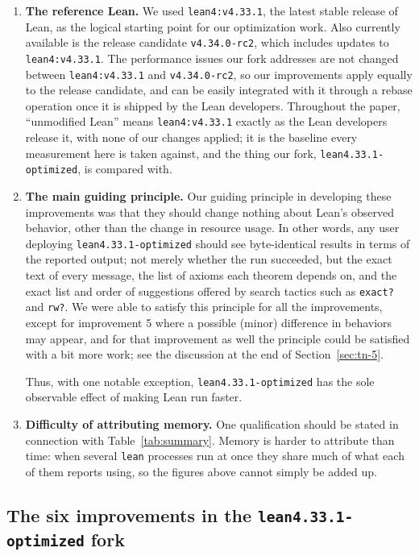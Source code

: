 \documentclass{article}
\newcommand{\Lean}{Lean\xspace}      %
\newcommand{\lean}{\texttt{lean}\xspace}      %
\newcommand{\currentlean}{\texttt{lean4:v4.33.1}\xspace}
\newcommand{\leanreleasecandidate}{\texttt{v4.34.0-rc2}\xspace}
\newcommand{\altlean}{\texttt{lean4.33.1-\allowbreak optimized}\xspace}
\begin{document}
\begin{enumerate}

\item \textbf{The reference \Lean.} We used \currentlean, the latest stable release of \Lean, as the logical starting point for our optimization work. Also currently available is the release candidate \leanreleasecandidate, which includes updates to \currentlean \cite{lean-rc,lean-rc-releasenotes}. The performance issues our fork addresses are not changed between \currentlean and \leanreleasecandidate, so our improvements apply equally to the release candidate, and can be easily integrated with it through a rebase operation once it is shipped by the \Lean developers. Throughout the paper, ``unmodified \Lean'' means \currentlean exactly as the \Lean
developers release it, with none of our changes applied; it is the baseline every measurement
here is taken against, and the thing our fork, \altlean, is compared with.

\item \textbf{The main guiding principle.} Our guiding principle in developing these improvements was that they should change nothing about \Lean's observed behavior, other than the change in resource usage. In other words, any user deploying \altlean should see byte-identical results in terms of the reported output; not merely whether the run succeeded, but the exact text of every message, the list of axioms each theorem depends on, and the exact list and order of suggestions offered by search tactics such as \texttt{exact?} and \texttt{rw?}. 
We were able to satisfy this principle for all the improvements, except for improvement 5 where  a possible (minor) difference in behaviors may appear, and for that improvement as well the principle could be satisfied with a bit more work; see the discussion at the end of Section~\ref{sec:tn-5}.

Thus, with one notable exception, \altlean has the sole observable effect of making \Lean run faster.

\item \textbf{Difficulty of attributing memory.} One qualification should be stated in connection with Table~\ref{tab:summary}. Memory is harder to attribute than time: when several \lean processes run at once they share much of what each of them reports using, so the figures above cannot simply be added up.

\end{enumerate}

\subsection{The six improvements in the \altlean fork}
\end{document}

